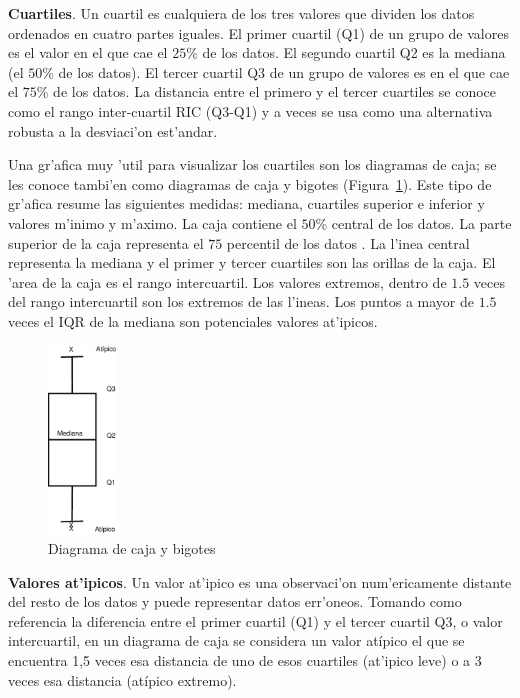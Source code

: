\begin{description}
\medskip
\textbf{Cuartiles}. Un cuartil es cualquiera de los tres valores que dividen los datos ordenados en cuatro partes iguales. El primer cuartil (Q1) de un grupo de valores es el valor en el que cae el $25$\% de los datos. El segundo cuartil Q2 es la mediana (el $50$\% de los datos). El tercer cuartil Q3 de un grupo de valores es en el que cae el $75$\% de los datos. La distancia entre el primero y el tercer cuartiles se conoce como el rango inter-cuartil RIC (Q3-Q1) y a veces se usa como una alternativa robusta a la desviaci'on est'andar.

Una gr'afica muy 'util para visualizar los cuartiles son los diagramas de caja; se les conoce tambi'en como diagramas de caja y bigotes (Figura~\ref{fig:bigotes}). Este tipo de gr'afica resume las siguientes medidas: mediana, cuartiles superior e inferior y valores m'inimo y m'aximo. La caja contiene el $50$\% central de los datos. La parte superior de la caja representa el $75$ percentil de los datos . La l'inea central representa la mediana y el primer y tercer cuartiles son las orillas de la caja. El 'area de la caja es el rango intercuartil. Los valores extremos, dentro de $1.5$ veces del rango intercuartil son los extremos de las l'ineas. Los puntos a mayor de $1.5$ veces el IQR de la mediana son potenciales valores at'ipicos. 

\begin{figure}[h]
    \begin{center}
    \includegraphics[height=5cm,keepaspectratio]{theimg/boxplotdia}
    \caption[Diagrama de caja y bigotes]{Diagrama de caja y bigotes}
    \label{fig:bigotes}
    \end{center}
\end{figure}

\medskip
\textbf{Valores at'ipicos}. Un valor at'ipico es una observaci'on num'ericamente distante del resto de los datos y puede representar datos err'oneos. Tomando como referencia la diferencia entre el primer cuartil (Q1) y el tercer cuartil Q3, o valor intercuartil, en un diagrama de caja se considera un valor atípico el que se encuentra 1,5 veces esa distancia de uno de esos cuartiles (at'ipico leve) o a 3 veces esa distancia (atípico extremo).


\end{description}
